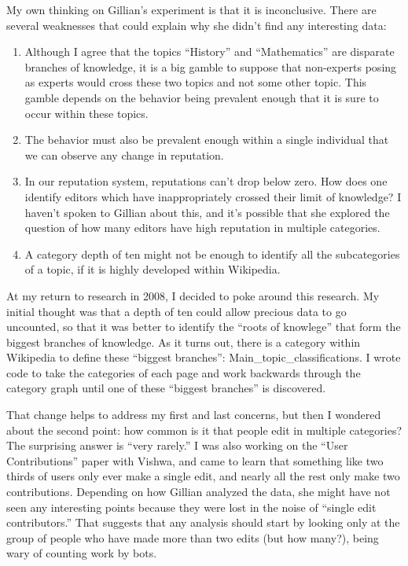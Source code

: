 My own thinking on Gillian's experiment is that it is inconclusive.
There are several weaknesses that could explain why she didn't
find any interesting data:
\begin{enumerate}
\item Although I agree that the topics ``History'' and ``Mathematics''
	are disparate branches of knowledge, it is a big gamble to
	suppose that non-experts posing as experts would cross these
	two topics and not some other topic.
	This gamble depends on the behavior being prevalent enough
	that it is sure to occur within these topics.
\item The behavior must also be prevalent enough within a single
	individual that we can observe any change in reputation.
\item In our reputation system, reputations can't drop below zero.
	How does one identify editors which have inappropriately
	crossed their limit of knowledge?  I haven't spoken to Gillian
	about this, and it's possible that she explored the question
	of how many editors have high reputation in multiple categories.
\item A category depth of ten might not be enough to identify all the
	subcategories of a topic, if it is highly developed within
	Wikipedia.
\end{enumerate}

At my return to research in 2008, I decided to poke around this research.
My initial thought was that a depth of ten could allow precious data
to go uncounted, so that it was better to identify the ``roots of
knowlege'' that form the biggest branches of knowledge.
As it turns out, there is a category within Wikipedia to define
these ``biggest branches'': Main\_topic\_classifications.
I wrote code to take the categories of each page and work
backwards through the category graph until one of these
``biggest branches'' is discovered.

That change helps to address my first and last concerns, but then I wondered
about the second point: how common is it that people edit in
multiple categories?
The surprising answer is ``very rarely.''
I was also working on the ``User Contributions'' paper with Vishwa,
and came to learn that something like two thirds of users only
ever make a single edit, and nearly all the rest only make two contributions.
Depending on how Gillian analyzed the data, she might have not seen
any interesting points because they were lost in the noise of
``single edit contributors.''
That suggests that any analysis should start by looking only
at the group of people who have made more than two edits (but how
many?), being wary of counting work by bots.


